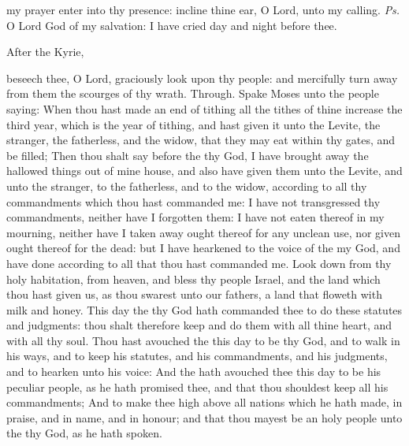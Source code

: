 \introit
{} my prayer enter into thy presence: incline thine ear, O Lord, unto my calling. \textit{Ps.} O Lord God of my salvation: I have cried day and night before thee.
\begin{rubric}
    After the Kyrie,
\end{rubric}
\collect
{} beseech thee, O Lord, graciously look upon thy people: and mercifully turn away from them the scourges of thy wrath. Through.
 Spake Moses unto the people saying: When thou hast made an end of tithing all the tithes of thine increase the third year, which is the year of tithing, and hast given it unto the Levite, the stranger, the fatherless, and the widow, that they may eat within thy gates, and be filled; Then thou shalt say before the  thy God, I have brought away the hallowed things out of mine house, and also have given them unto the Levite, and unto the stranger, to the fatherless, and to the widow, according to all thy commandments which thou hast commanded me: I have not transgressed thy commandments, neither have I forgotten them: I have not eaten thereof in my mourning, neither have I taken away ought thereof for any unclean use, nor given ought thereof for the dead: but I have hearkened to the voice of the  my God, and have done according to all that thou hast commanded me. Look down from thy holy habitation, from heaven, and bless thy people Israel, and the land which thou hast given us, as thou swarest unto our fathers, a land that floweth with milk and honey. This day the  thy God hath commanded thee to do these statutes and judgments: thou shalt therefore keep and do them with all thine heart, and with all thy soul. Thou hast avouched the  this day to be thy God, and to walk in his ways, and to keep his statutes, and his commandments, and his judgments, and to hearken unto his voice: And the  hath avouched thee this day to be his peculiar people, as he hath promised thee, and that thou shouldest keep all his commandments; And to make thee high above all nations which he hath made, in praise, and in name, and in honour; and that thou mayest be an holy people unto the  thy God, as he hath spoken.
